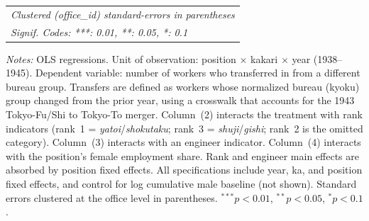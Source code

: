 \begin{table}[htbp]
\begin{threeparttable}
\begin{tabular}{lcccc}
   \midrule \midrule
   \multicolumn{5}{l}{\emph{Clustered (office\_id) standard-errors in parentheses}}\\
   \multicolumn{5}{l}{\emph{Signif. Codes: ***: 0.01, **: 0.05, *: 0.1}}\\
\end{tabular}
\begin{tablenotes}[flushleft]
\footnotesize
\item \textit{Notes:} OLS regressions. Unit of observation: position $\times$ kakari $\times$ year (1938--1945). Dependent variable: number of workers who transferred in from a different bureau group. Transfers are defined as workers whose normalized bureau (kyoku) group changed from the prior year, using a crosswalk that accounts for the 1943 Tokyo-Fu/Shi to Tokyo-To merger. Column~(2) interacts the treatment with rank indicators (rank~1 = \emph{yatoi}/\emph{shokutaku}; rank~3 = \emph{shuji}/\emph{gishi}; rank~2 is the omitted category). Column~(3) interacts with an engineer indicator. Column~(4) interacts with the position's female employment share. Rank and engineer main effects are absorbed by position fixed effects. All specifications include year, ka, and position fixed effects, and control for log cumulative male baseline (not shown). Standard errors clustered at the office level in parentheses. $^{***}p<0.01$, $^{**}p<0.05$, $^{*}p<0.1$.
\end{tablenotes}
\end{threeparttable}
\end{table}
